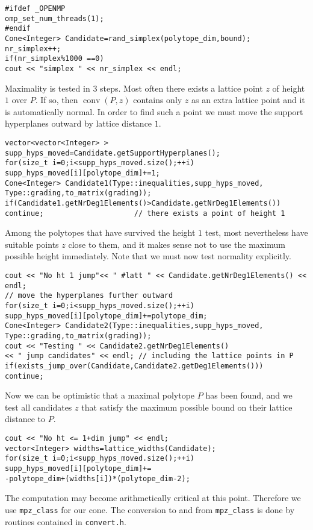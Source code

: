 \documentclass[12pt,a4paper]{scrartcl}
\theoremstyle{definition}
\begin{document}
\begin{small}
\begin{Verbatim}
#ifdef _OPENMP
omp_set_num_threads(1);
#endif
Cone<Integer> Candidate=rand_simplex(polytope_dim,bound);
nr_simplex++;
if(nr_simplex%1000 ==0)
cout << "simplex " << nr_simplex << endl;
\end{Verbatim}
Maximality is tested in $3$ steps. Most often there exists a lattice  point $z$ of height $1$ over $P$. If so, then $\operatorname{conv}(P,z)$ contains only $z$ as an extra lattice point and it is automatically normal. In order to find such a point we must move the support hyperplanes outward by lattice distance $1$.
\begin{Verbatim}
vector<vector<Integer> > supp_hyps_moved=Candidate.getSupportHyperplanes();
for(size_t i=0;i<supp_hyps_moved.size();++i)
supp_hyps_moved[i][polytope_dim]+=1;
Cone<Integer> Candidate1(Type::inequalities,supp_hyps_moved, 
Type::grading,to_matrix(grading));
if(Candidate1.getNrDeg1Elements()>Candidate.getNrDeg1Elements()) 
continue;                     // there exists a point of height 1        
\end{Verbatim}
Among the polytopes that have survived the height $1$ test, most nevertheless have suitable points $z$ close to them, and it makes sense not to use the maximum possible height immediately. Note that we must now test normality explicitly.
\begin{Verbatim}
cout << "No ht 1 jump"<< " #latt " << Candidate.getNrDeg1Elements() << endl; 
// move the hyperplanes further outward
for(size_t i=0;i<supp_hyps_moved.size();++i)
supp_hyps_moved[i][polytope_dim]+=polytope_dim; 
Cone<Integer> Candidate2(Type::inequalities,supp_hyps_moved,
Type::grading,to_matrix(grading));
cout << "Testing " << Candidate2.getNrDeg1Elements() 
<< " jump candidates" << endl; // including the lattice points in P                    
if(exists_jump_over(Candidate,Candidate2.getDeg1Elements()))
continue;
\end{Verbatim}
Now we can be optimistic that a maximal polytope $P$ has been found, and we test all candidates $z$ that satisfy the maximum possible bound on their lattice distance to $P$.
\begin{Verbatim}		
cout << "No ht <= 1+dim jump" << endl;
vector<Integer> widths=lattice_widths(Candidate);
for(size_t i=0;i<supp_hyps_moved.size();++i)
supp_hyps_moved[i][polytope_dim]+=
-polytope_dim+(widths[i])*(polytope_dim-2);
\end{Verbatim}
The computation may become arithmetically critical at this point. Therefore we use \verb|mpz_class| for our cone. The conversion to and from \verb|mpz_class| is done by routines contained in \verb|convert.h|.

\end{small}
\end{document}
